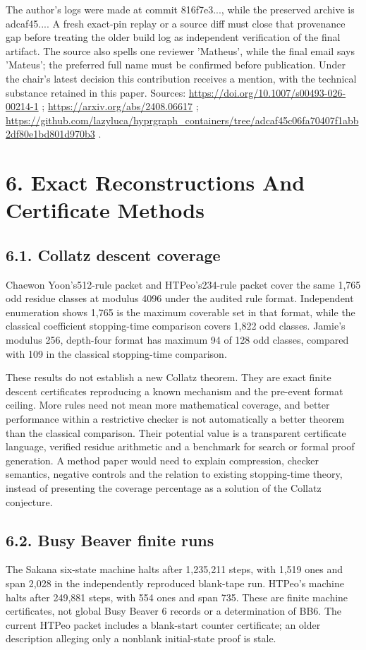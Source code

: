 \documentclass[11pt,a4paper]{article}
\begin{document}
The author's logs were made at commit 816f7e3..., while the preserved archive is adcaf45.... A fresh exact-pin replay or a source diff must close that provenance gap before treating the older build log as independent verification of the final artifact. The source also spells one reviewer 'Matheus', while the final email says 'Mateus'; the preferred full name must be confirmed before publication. Under the chair's latest decision this contribution receives a mention, with the technical substance retained in this paper. Sources: \url{https://doi.org/10.1007/s00493-026-00214-1} ; \url{https://arxiv.org/abs/2408.06617} ; \url{https://github.com/lazyluca/hyprgraph_containers/tree/adcaf45c06fa70407f1abb2df80e1bd801d970b3} .

\section{6. Exact Reconstructions And Certificate Methods}
\subsection{6.1. Collatz descent coverage}
Chaewon Yoon's512-rule packet and HTPeo's234-rule packet cover the same 1,765 odd residue classes at modulus 4096 under the audited rule format. Independent enumeration shows 1,765 is the maximum coverable set in that format, while the classical coefficient stopping-time comparison covers 1,822 odd classes. Jamie's modulus 256, depth-four format has maximum 94 of 128 odd classes, compared with 109 in the classical stopping-time comparison.

These results do not establish a new Collatz theorem. They are exact finite descent certificates reproducing a known mechanism and the pre-event format ceiling. More rules need not mean more mathematical coverage, and better performance within a restrictive checker is not automatically a better theorem than the classical comparison. Their potential value is a transparent certificate language, verified residue arithmetic and a benchmark for search or formal proof generation. A method paper would need to explain compression, checker semantics, negative controls and the relation to existing stopping-time theory, instead of presenting the coverage percentage as a solution of the Collatz conjecture.

\subsection{6.2. Busy Beaver finite runs}
The Sakana six-state machine halts after 1,235,211 steps, with 1,519 ones and span 2,028 in the independently reproduced blank-tape run. HTPeo's machine halts after 249,881 steps, with 554 ones and span 735. These are finite machine certificates, not global Busy Beaver 6 records or a determination of BB6. The current HTPeo packet includes a blank-start counter certificate; an older description alleging only a nonblank initial-state proof is stale.
\end{document}
